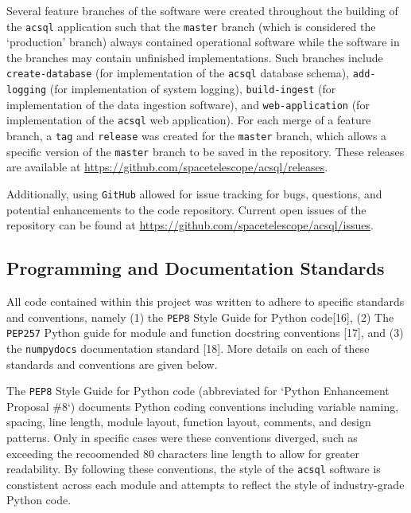 \documentclass[10pt,journal,compsoc]{IEEEtran}
\begin{document}
Several feature branches of the software were created throughout the building of the \texttt{acsql} application such that the \texttt{master} branch (which is considered the
`production' branch) always contained operational software while the software in the branches may contain unfinished implementations.  Such branches include \texttt{create-database}
(for implementation of the \texttt{acsql} database schema), \texttt{add-logging} (for implementation of system logging), \texttt{build-ingest} (for implementation of the data
ingestion software), and \texttt{web-application} (for implementation of the \texttt{acsql} web application).  For each merge of a feature branch, a \texttt{tag} and \texttt{release}
was created for the \texttt{master} branch, which allows a specific version of the \texttt{master} branch to be saved in the repository.  These releases are available at
\textcolor{blue}{\url{https://github.com/spacetelescope/acsql/releases}}.

Additionally, using \texttt{GitHub} allowed for issue tracking for bugs, questions, and potential enhancements to the code repository.  Current open issues of the repository
can be found at \textcolor{blue}{\url{https://github.com/spacetelescope/acsql/issues}}.


\subsection{Programming and Documentation Standards} \label{sec3.2}

All code contained within this project was written to adhere to specific standards and conventions, namely (1) the \texttt{PEP8} Style Guide for Python code[16], (2) The
\texttt{PEP257} Python guide for module and function docstring conventions [17], and (3) the \texttt{numpydocs} documentation standard [18].  More details on each of these
standards and conventions are given below.

The \texttt{PEP8} Style Guide for Python code (abbreviated for `Python Enhancement Proposal \#8`) documents Python coding conventions including variable naming, spacing,
line length, module layout, function layout, comments, and design patterns.  Only in specific cases were these conventions diverged, such as exceeding the recoomended 80 characters line
length to allow for greater readability.  By following these conventions, the style of the \texttt{acsql} software is constistent across each module and attempts to reflect the style of
industry-grade Python code.
\end{document}

